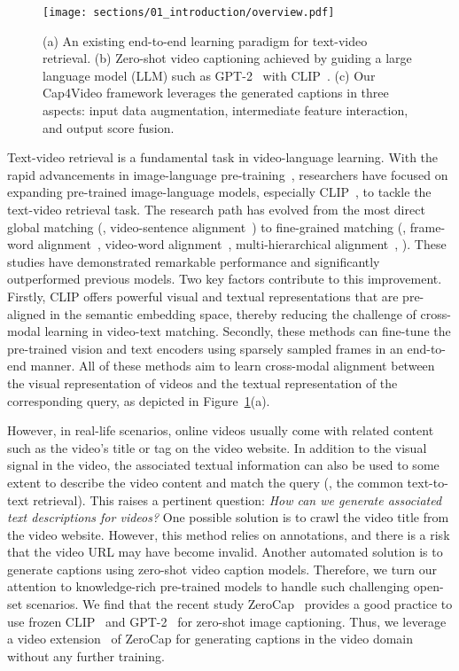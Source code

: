 \documentclass[10pt,twocolumn,letterpaper]{article}
\begin{document}
\begin{figure}[t]
\begin{center}
\texttt{[image: sections/01\_introduction/overview.pdf]}
\end{center}
\caption{(a) An existing end-to-end learning paradigm for text-video retrieval.  (b) Zero-shot video captioning achieved by guiding a large language model (LLM) such as GPT-2~\cite{GPT} with CLIP~\cite{clip}. (c) Our Cap4Video framework leverages the generated captions in three aspects: input data augmentation, intermediate feature interaction, and output score fusion.
}
\label{fig:overview}
\end{figure}




Text-video retrieval is a fundamental task in video-language learning. 
With the rapid advancements in image-language pre-training~\cite{clip,ALIGN,yu2022coca,yuan2021florence}, researchers have focused on expanding pre-trained image-language models, especially CLIP~\cite{clip}, to tackle the text-video retrieval task. The research path has evolved from the most direct global matching (\ie, video-sentence alignment~\cite{luo2022clip4clip,gao2021clip2tv}) to fine-grained matching (\eg, frame-word alignment~\cite{wang2022disentangled}, video-word alignment~\cite{gorti2022xpool}, multi-hierarchical alignment~\cite{fang2021clip2video,min2022hunyuan_tvr}, \etc).
These studies have demonstrated remarkable performance and significantly outperformed previous models.
Two key factors contribute to this improvement. Firstly, CLIP offers powerful visual and textual representations that are pre-aligned in the semantic embedding space, thereby reducing the challenge of cross-modal learning in video-text matching. Secondly, these methods can fine-tune the pre-trained vision and text encoders using sparsely sampled frames in an end-to-end manner.
All of these methods aim to learn cross-modal alignment between the visual representation of videos and the textual representation of the corresponding query, as depicted in Figure~\ref{fig:overview}(a).

However, in real-life scenarios, online videos usually come with related content such as the video's title or tag on the video website. In addition to the visual signal in the video, the associated textual information can also be used to some extent to describe the video content and match the query (\ie, the common text-to-text retrieval). This raises a pertinent question: \emph{How can we generate associated text descriptions for videos?}
One possible solution is to crawl the video title from the video website. However, this method relies on annotations, and there is a risk that the video URL may have become invalid. Another automated solution is to generate captions using zero-shot video caption models. Therefore, we turn our attention to knowledge-rich pre-trained models to handle such challenging open-set scenarios.
We find that the recent study ZeroCap~\cite{tewel2022zerocap} provides a good practice to use frozen CLIP~\cite{clip} and GPT-2~\cite{GPT} for zero-shot image captioning. Thus, we leverage a video extension~\cite{videocap} of ZeroCap for generating captions in the video domain without any further training.
\end{document}
